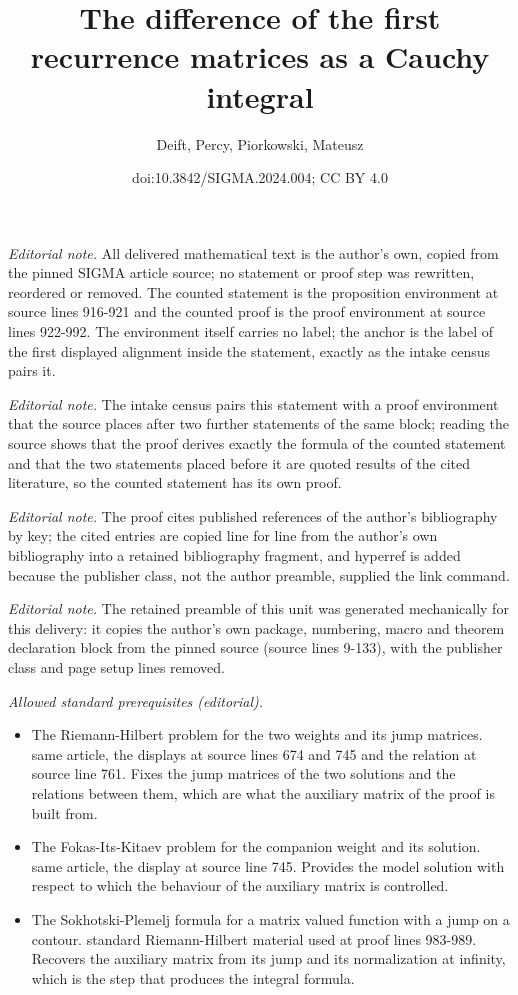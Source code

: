 \documentclass[10pt,a4paper]{amsart}
\title{The difference of the first recurrence matrices as a Cauchy integral}
\author{Deift, Percy, Piorkowski, Mateusz}
\date{doi:10.3842/SIGMA.2024.004; CC BY 4.0}
\numberwithin{equation}{section}
\begin{document}
\maketitle
\setcounter{section}{3}
\setcounter{Theorem}{4}
\noindent\textit{Editorial note.} All delivered mathematical text is the author's own, copied from the pinned SIGMA article source; no statement or proof step was rewritten, reordered or removed. The counted statement is the proposition environment at source lines 916-921 and the counted proof is the proof environment at source lines 922-992. The environment itself carries no label; the anchor is the label of the first displayed alignment inside the statement, exactly as the intake census pairs it.\par\medskip
\noindent\textit{Editorial note.} The intake census pairs this statement with a proof environment that the source places after two further statements of the same block; reading the source shows that the proof derives exactly the formula of the counted statement and that the two statements placed before it are quoted results of the cited literature, so the counted statement has its own proof.\par\medskip
\noindent\textit{Editorial note.} The proof cites published references of the author's bibliography by key; the cited entries are copied line for line from the author's own bibliography into a retained bibliography fragment, and hyperref is added because the publisher class, not the author preamble, supplied the link command.\par\medskip
\noindent\textit{Editorial note.} The retained preamble of this unit was generated mechanically for this delivery: it copies the author's own package, numbering, macro and theorem declaration block from the pinned source (source lines 9-133), with the publisher class and page setup lines removed.\par\medskip
\noindent\textit{Allowed standard prerequisites (editorial).}\begin{itemize}
\item The Riemann-Hilbert problem for the two weights and its jump matrices. same article, the displays at source lines 674 and 745 and the relation at source line 761. Fixes the jump matrices of the two solutions and the relations between them, which are what the auxiliary matrix of the proof is built from.
\item The Fokas-Its-Kitaev problem for the companion weight and its solution. same article, the display at source line 745. Provides the model solution with respect to which the behaviour of the auxiliary matrix is controlled.
\item The Sokhotski-Plemelj formula for a matrix valued function with a jump on a contour. standard Riemann-Hilbert material used at proof lines 983-989. Recovers the auxiliary matrix from its jump and its normalization at infinity, which is the step that produces the integral formula.
\end{itemize}\medskip
\end{document}
